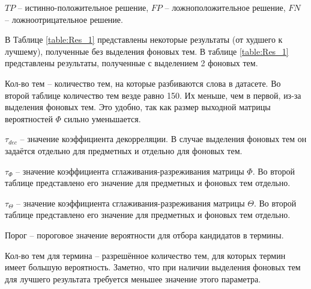 \documentclass[a4paper, 12pt]{article}
\begin{document}
     $TP$ -- истинно-положительное решение, $FP$ -- ложноположительное решение, $FN$ -- ложноотрицательное решение.

    В Таблице \ref{table:Res_1} представлены некоторые результаты (от худшего к лучшему), полученные без выделения фоновых тем. В таблице \ref{table:Res_1} представлены результаты, полученные с выделением 2 фоновых тем.

    Кол-во тем -- количество тем, на которые разбиваются слова в датасете. Во второй таблице количество тем везде равно 150. Их меньше, чем в первой, из-за выделения фоновых тем. Это удобно, так как размер выходной матрицы вероятностей $\Phi$ сильно уменьшается.

    $\tau_{dec}$ -- значение коэффициента декорреляции. В случае выделения фоновых тем он задаётся отдельно для предметных и отдельно для фоновых тем.

    $\tau_{\Phi}$ -- значение коэффициента сглаживания-разреживания матрицы $\Phi$. Во второй таблице представлено его значение для предметных и фоновых тем отдельно.

    $\tau_{\Theta}$ -- значение коэффициента сглаживания-разреживания матрицы $\Theta$. Во второй таблице представлено его значение для предметных и фоновых тем отдельно.

    Порог -- пороговое значение вероятности для отбора кандидатов в термины.

    Кол-во тем для термина -- разрешённое количество тем, для которых термин имеет большую вероятность. Заметно, что при наличии выделения фоновых тем для лучшего результата требуется меньшее значение этого параметра.
\end{document}
